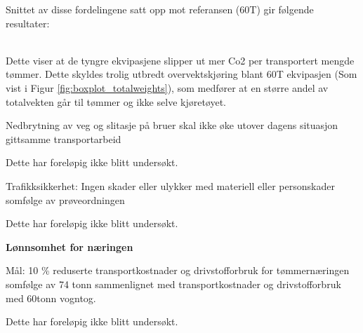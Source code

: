 Snittet av disse fordelingene satt opp mot referansen (60T) gir følgende resultater:

\begin{table}[H]
    \caption{Analyse av lastevolum og reduksjon i antall transportturer}
    \label{tab:co2_tonkm}
\end{table}

\phantom{}\\
Dette viser at de tyngre ekvipasjene slipper ut mer Co2 per transportert mengde tømmer. Dette skyldes trolig
utbredt overvektskjøring blant 60T ekvipasjen (Som vist i Figur \ref{fig:boxplot_totalweights}), som medfører
at en større andel av totalvekten går til tømmer og ikke selve kjøretøyet.

\begin{formal}
Nedbrytning av veg og slitasje på bruer skal ikke øke utover dagens situasjon gittsamme transportarbeid
\end{formal}
Dette har foreløpig ikke blitt undersøkt.

\begin{formal}
Trafikksikkerhet: Ingen skader eller ulykker med materiell eller personskader somfølge av prøveordningen
\end{formal}
Dette har foreløpig ikke blitt undersøkt.

{
\large
\textbf
{
Lønnsomhet for næringen
}
}

\begin{formal}
Mål: 10 \% reduserte transportkostnader og drivstofforbruk for tømmernæringen somfølge av 74 tonn sammenlignet med transportkostnader og drivstofforbruk med 60tonn vogntog.
\end{formal}
Dette har foreløpig ikke blitt undersøkt.
